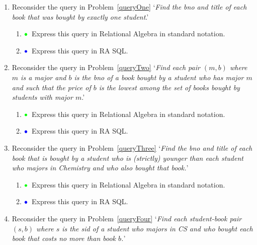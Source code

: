 \documentclass[11pt]{article}
\newcommand{\green}[1]{{\color{green}#1}}
\newcommand{\blue}[1]{{\color{blue}#1}}
\newcommand{\greenbullet}{$\green{\bullet}$}
\newcommand{\bluebullet}{$\blue{\bullet}$}
\begin{document}
\begin{enumerate}[resume]
\item Reconsider the query in Problem~\ref{queryOne}
`\emph{Find the bno and title of each book that
was bought by exactly one student}.' 
     \begin{enumerate}
    
     \item  \greenbullet\  Express this query in Relational Algebra in standard notation.
     

     \item  \bluebullet\ Express this query in RA SQL.
     \end{enumerate}

\newpage

\item Reconsider the query in Problem~\ref{queryTwo}
`\emph{Find each pair $(m, b)$ where $m$ is a major and $b$ is the bno of a book bought by a student who has major $m$ and such that the price of $b$ is the lowest among the set of books bought by students with major $m$}.'
     \begin{enumerate}
    
     \item  \greenbullet\  Express this query in Relational Algebra in standard notation.
    
     \item  \bluebullet\  Express this query in RA SQL.
     

     \end{enumerate}

\item Reconsider the query in Problem~\ref{queryThree}
`\emph{Find the bno and title of each book that is bought by a student who
is (strictly) younger than each student who majors in Chemistry and
who also bought that book.}'
     \begin{enumerate}
    
     \item  \greenbullet\  Express this query in Relational Algebra in standard notation.
    

     \item  \bluebullet\  Express this query in RA SQL.
     \end{enumerate}

\item Reconsider the query in Problem~\ref{queryFour}
`\emph{Find each student-book pair $(s,b)$ where $s$ is the sid of a student who majors in CS and who bought each book that costs no more than book $b$.}'
     \begin{enumerate}
    

\end{enumerate}
\end{enumerate}
\end{document}
